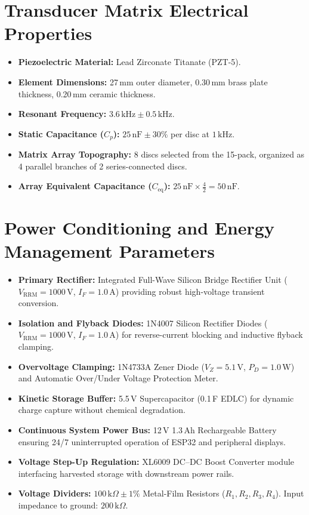 \section{Transducer Matrix Electrical Properties}
\begin{itemize}
    \item \textbf{Piezoelectric Material:} Lead Zirconate Titanate (PZT-5).
    \item \textbf{Element Dimensions:} 27\,mm outer diameter, 0.30\,mm brass plate thickness, 0.20\,mm ceramic thickness.
    \item \textbf{Resonant Frequency:} $3.6\,\text{kHz} \pm 0.5\,\text{kHz}$.
    \item \textbf{Static Capacitance ($C_p$):} $25\,\text{nF} \pm 30\%$ per disc at $1\,\text{kHz}$.
    \item \textbf{Matrix Array Topography:} 8 discs selected from the 15-pack, organized as 4 parallel branches of 2 series-connected discs.
    \item \textbf{Array Equivalent Capacitance ($C_{\text{eq}}$):} $25\,\text{nF} \times \frac{4}{2} = 50\,\text{nF}$.
\end{itemize}

\section{Power Conditioning and Energy Management Parameters}
\begin{itemize}
    \item \textbf{Primary Rectifier:} Integrated Full-Wave Silicon Bridge Rectifier Unit ($V_{\text{RRM}} = 1000\,\text{V}$, $I_F = 1.0\,\text{A}$) providing robust high-voltage transient conversion.
    \item \textbf{Isolation and Flyback Diodes:} 1N4007 Silicon Rectifier Diodes ($V_{\text{RRM}} = 1000\,\text{V}$, $I_F = 1.0\,\text{A}$) for reverse-current blocking and inductive flyback clamping.
    \item \textbf{Overvoltage Clamping:} 1N4733A Zener Diode ($V_Z = 5.1\,\text{V}$, $P_D = 1.0\,\text{W}$) and Automatic Over/Under Voltage Protection Meter.
    \item \textbf{Kinetic Storage Buffer:} 5.5\,V Supercapacitor (0.1\,F EDLC) for dynamic charge capture without chemical degradation.
    \item \textbf{Continuous System Power Bus:} 12\,V 1.3\,Ah Rechargeable Battery ensuring 24/7 uninterrupted operation of ESP32 and peripheral displays.
    \item \textbf{Voltage Step-Up Regulation:} XL6009 DC--DC Boost Converter module interfacing harvested storage with downstream power rails.
    \item \textbf{Voltage Dividers:} $100\,\text{k}\Omega \pm 1\%$ Metal-Film Resistors ($R_1, R_2, R_3, R_4$). Input impedance to ground: $200\,\text{k}\Omega$.
\end{itemize}
